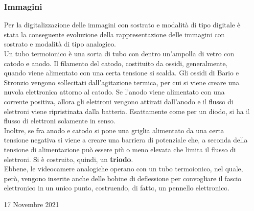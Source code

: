 \documentclass[a4paper]{extarticle}
\begin{document}
\subsubsection{Immagini}
Per la digitalizzazione delle immagini con sostrato e modalità di tipo digitale è stata la conseguente evoluzione della rappresentazione delle immagini con sostrato e modalità di tipo analogico.\\
Un tubo termoionico è una sorta di tubo con dentro un'ampolla di vetro con catodo e anodo. Il filamento del catodo, costituito da ossidi, generalmente, quando viene alimentato con una certa tensione si scalda. Gli ossidi di Bario e Stronzio vengono sollecitati dall'agitazione termica, per cui si viene creare una nuvola elettronica attorno al catodo. Se l'anodo viene alimentato con una corrente positiva, allora gli elettroni vengono attirati dall'anodo e il flusso di elettroni viene ripristinata dalla batteria. Esattamente come per un diodo, si ha il flusso di elettroni solamente in senso.\\
Inoltre, se fra anodo e catodo si pone una griglia alimentato da una certa tensione negativa si viene a creare una barriera di potenziale che, a seconda della tensione di alimentazione può essere più o meno elevata che limita il flusso di elettroni. Si è costruito, quindi, un \textbf{triodo}.\\
Ebbene, le videocamere analogiche operano con un tubo termoionico, nel quale, però, vengono inserite anche delle bobine di deflessione per convogliare il fascio elettronico in un unico punto, costruendo, di fatto, un pennello elettronico.


\newpage
\begin{center}
    17 Novembre 2021
\end{center}
\end{document}
